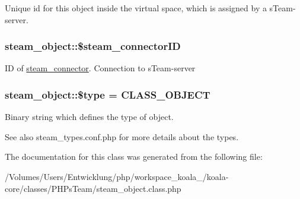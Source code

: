 \label{classsteam__object_ae727592524230da242a2a30cfe8fe4e2}
Unique id for this object inside the virtual space, which is assigned by a sTeam-\/server. \hypertarget{classsteam__object_aa2b7032221bf727957187a15d5afcca4}{
\subsubsection[{\$steam\_\-connectorID}]{\setlength{\rightskip}{0pt plus 5cm}steam\_\-object::\$steam\_\-connectorID}}
\label{classsteam__object_aa2b7032221bf727957187a15d5afcca4}
ID of \hyperlink{classsteam__connector}{steam\_\-connector}. Connection to sTeam-\/server \hypertarget{classsteam__object_af872b2f64e385ab2f9d2b55927b9333b}{
\subsubsection[{\$type}]{\setlength{\rightskip}{0pt plus 5cm}steam\_\-object::\$type = CLASS\_\-OBJECT}}
\label{classsteam__object_af872b2f64e385ab2f9d2b55927b9333b}
Binary string which defines the type of object. \begin{DoxySeeAlso}{See also}
steam\_\-types.conf.php for more details about the types. 
\end{DoxySeeAlso}


The documentation for this class was generated from the following file:\begin{DoxyCompactItemize}
\item 
/Volumes/Users/Entwicklung/php/workspace\_\-koala\_/koala-\/core/classes/PHPsTeam/steam\_\-object.class.php\end{DoxyCompactItemize}
